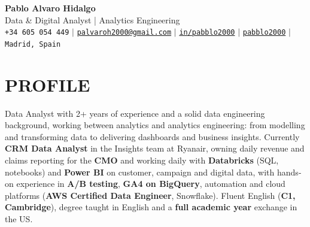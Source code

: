 \documentclass[a4paper,11pt]{article}
\begin{document}
\begin{center}
    \textbf{\Huge Pablo Alvaro Hidalgo} \\ \vspace{3pt}
    \large Data \& Digital Analyst | Analytics Engineering \\ \vspace{4pt}
    \small
    \faPhone* \hspace{1pt}\texttt{+34 605 054 449} \hspace{2pt} $|$ \hspace{2pt}
    \faEnvelope \hspace{1pt}\href{mailto:palvaroh2000@gmail.com}{\texttt{palvaroh2000@gmail.com}} \hspace{2pt} $|$ \hspace{2pt}
    \faLinkedin \hspace{1pt}\href{https://www.linkedin.com/in/pabblo2000/}{\texttt{in/pabblo2000}} \hspace{2pt} $|$ \hspace{2pt}
    \faGithub \hspace{1pt}\href{https://github.com/pabblo2000}{\texttt{pabblo2000}} \hspace{2pt} $|$ \hspace{2pt}
    \faMapMarker* \hspace{1pt}\texttt{Madrid, Spain}
\end{center}
\vspace{-8pt}

\section{PROFILE}
\small{
Data Analyst with 2+ years of experience and a solid data engineering background, working between analytics and analytics engineering: from modelling and transforming data to delivering dashboards and business insights.
Currently \textbf{CRM Data Analyst} in the Insights team at Ryanair, owning daily revenue and claims reporting for the \textbf{CMO} and working daily with \textbf{Databricks} (SQL, notebooks) and \textbf{Power BI} on customer, campaign and digital data, with hands-on experience in \textbf{A/B testing}, \textbf{GA4 on BigQuery}, automation and cloud platforms (\textbf{AWS Certified Data Engineer}, Snowflake).
Fluent English (\textbf{C1, Cambridge}), degree taught in English and a \textbf{full academic year} exchange in the US.
}
\vspace{-4pt}
\end{document}
